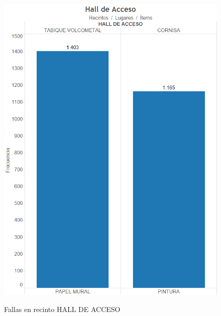 \documentclass[letter,12pt,oneside]{report}
\begin{document}
\begin{figure}[H]
\begin{center}
\includegraphics[scale=0.5]{images/hall.png}
\caption{Fallas en recinto HALL DE ACCESO}
\label{}
\end{center}
\end{figure}
\end{document}
